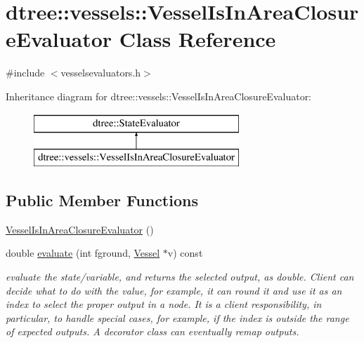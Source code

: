 \hypertarget{classdtree_1_1vessels_1_1_vessel_is_in_area_closure_evaluator}{}\section{dtree\+::vessels\+::Vessel\+Is\+In\+Area\+Closure\+Evaluator Class Reference}
\label{classdtree_1_1vessels_1_1_vessel_is_in_area_closure_evaluator}


{\ttfamily \#include $<$vesselsevaluators.\+h$>$}

Inheritance diagram for dtree\+::vessels\+::Vessel\+Is\+In\+Area\+Closure\+Evaluator\+:\begin{figure}[H]
\begin{center}
\leavevmode
\includegraphics[height=2.000000cm]{d2/d65/classdtree_1_1vessels_1_1_vessel_is_in_area_closure_evaluator}
\end{center}
\end{figure}
\subsection*{Public Member Functions}
\begin{DoxyCompactItemize}
\item 
\mbox{\hyperlink{classdtree_1_1vessels_1_1_vessel_is_in_area_closure_evaluator_aad14af2007888d12329db3ec3ca161d5}{Vessel\+Is\+In\+Area\+Closure\+Evaluator}} ()
\item 
double \mbox{\hyperlink{classdtree_1_1vessels_1_1_vessel_is_in_area_closure_evaluator_a4adddae82d9b3fbf507706fcffd4a692}{evaluate}} (int fground, \mbox{\hyperlink{class_vessel}{Vessel}} $\ast$v) const
\begin{DoxyCompactList}\small\item\em evaluate the state/variable, and returns the selected output, as double. Client can decide what to do with the value, for example, it can round it and use it as an index to select the proper output in a node. It is a client responsibility, in particular, to handle special cases, for example, if the index is outside the range of expected outputs. A decorator class can eventually remap outputs. \end{DoxyCompactList}\end{DoxyCompactItemize}



